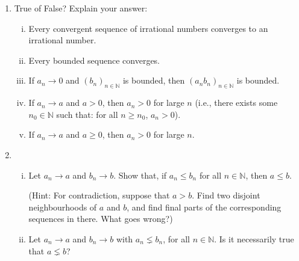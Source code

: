 \documentclass[11pt]{amsart}
\newcommand\N{{\mathbb N}}
\theoremstyle{plain}
\theoremstyle{definition}
\numberwithin{equation}{section}
\begin{document}
\begin{enumerate}
\item True of False? Explain your answer:
\begin{enumerate}[(i)]
\item Every convergent sequence of irrational numbers converges to an irrational number.
\item Every bounded sequence converges.
\item If $a_n\rightarrow 0$ and $(b_n)_{n\in\N}$ is bounded, then $(a_nb_n)_{n\in\N}$ is bounded.
\item If $a_n\rightarrow a$ and $a>0$, then $a_n>0$ for large $n$ (i.e., there exists some $n_0\in\N$ such that: for all $n\geq n_0$, $a_n>0$).
\item If $a_n\rightarrow a$ and $a\geq 0$, then $a_n>0$ for large $n$.
\end{enumerate}
\vspace{0.4in}

\item 
\begin{enumerate}[(i)]
\item Let $a_n\rightarrow a$ and $b_n\rightarrow b$. Show that, if $a_n\leq b_n$ for all $n\in\N$, then $a\leq b$.

(Hint: For contradiction, suppose that $a> b$. Find two disjoint neighbourhoods of $a$ and $b$, and find final parts of the corresponding sequences in there. What goes wrong?)
\item Let $a_n\rightarrow a$ and $b_n\rightarrow b$ with $a_n\lneq b_n$, for all $n\in\N$. Is it necessarily true that $a\lneq b$?
\end{enumerate}
\end{enumerate}
\end{document}
